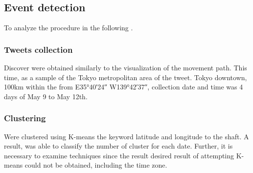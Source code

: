 \subsection{Event detection}
To analyze the procedure in the following .


\subsubsection{Tweets collection}
Discover were obtained similarly to the visualization of the movement path. This time, as a sample of the Tokyo metropolitan area of the tweet. Tokyo downtown, 100km within the from E\ang{35;40;24} W\ang{139;42;37}, collection date and time was 4 days of May 9 to May 12th.

\subsubsection{Clustering}
Were clustered using K-means the keyword latitude and longitude to the shaft.
A result, was able to classify the number of cluster  for each date.
Further, it is necessary to examine techniques since the result desired result of attempting K-means could not be obtained, including the time zone.


